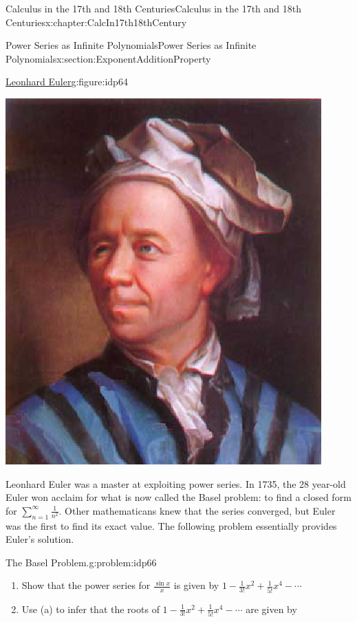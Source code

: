 \begin{chapterptx}{Calculus in the 17th and 18th Centuries}{}{Calculus in the 17th and 18th Centuries}{}{}{x:chapter:CalcIn17th18thCentury}
\begin{sectionptx}{Power Series as Infinite Polynomials}{}{Power Series as Infinite Polynomials}{}{}{x:section:ExponentAdditionProperty}
\begin{figureptx}{\href{https://mathshistory.st-andrews.ac.uk/Biographies/Euler/}{Leonhard Euler}\protect\footnotemark{}}{g:figure:idp64}{}
\begin{image}{0.325}{0.35}{0.325}
				\includegraphics[width=\linewidth]{external/images/Euler.png}
			\end{image}%
			\tcblower
		\end{figureptx}%
		Leonhard Euler was a master at exploiting power series. In 1735, the 28 year-old Euler won acclaim for what is now called the Basel problem: to find a closed form for \(\sum_{n=1}^\infty\frac{1}{n^2}\). Other mathematicans knew that the series converged, but Euler was the first to find its exact value. The following problem essentially provides Euler's solution.%
		\begin{problem}{The Basel Problem.}{g:problem:idp66}%
			\begin{enumerate}[font=\bfseries,label=(\alph*),ref=\alph*]
				\item{}Show that the power series for \(\frac{\sin x}{x}\) is given by \(1-\frac{1}{3!}x^2+\frac{1}{5!}x^4-\cdots\)%
				\item{}Use (a) to infer that the roots of \(1-\frac{1}{3!}x^2+\frac{1}{5!}x^4-\cdots\) are given by%
				\begin{equation*}

\end{equation*}
\end{enumerate}
\end{problem}
\end{sectionptx}
\end{chapterptx}
